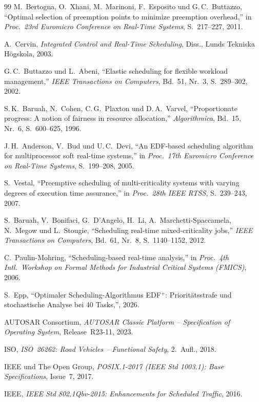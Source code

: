 ﻿\documentclass[a4paper,12pt]{report}
\theoremstyle{definition}
\begin{document}
\begin{thebibliography}{99}
M.\ Bertogna, O.\ Xhani, M.\ Marinoni, F.\ Esposito und G.\,C.\ Buttazzo,
``Optimal selection of preemption points to minimize preemption overhead,''
in \textit{Proc.\ 23rd Euromicro Conference on Real-Time Systems},
S.~217--227, 2011.


A.\ Cervin,
\textit{Integrated Control and Real-Time Scheduling},
Diss., Lunds Tekniska Högskola, 2003.

G.\,C.\ Buttazzo und L.\ Abeni,
``Elastic scheduling for flexible workload management,''
\textit{IEEE Transactions on Computers}, Bd.~51, Nr.~3, S.~289--302, 2002.


S.\,K.\ Baruah, N.\ Cohen, C.\,G.\ Plaxton und D.\,A.\ Varvel,
``Proportionate progress: A notion of fairness in resource allocation,''
\textit{Algorithmica}, Bd.~15, Nr.~6, S.~600--625, 1996.

J.\,H.\ Anderson, V.\ Bud und U.\,C.\ Devi,
``An EDF-based scheduling algorithm for multiprocessor soft real-time systems,''
in \textit{Proc.\ 17th Euromicro Conference on Real-Time Systems},
S.~199--208, 2005.


S.\ Vestal,
``Preemptive scheduling of multi-criticality systems with varying
degrees of execution time assurance,''
in \textit{Proc.\ 28th IEEE RTSS}, S.~239--243, 2007.

S.\ Baruah, V.\ Bonifaci, G.\ D'Angelo, H.\ Li, A.\ Marchetti-Spaccamela,
N.\ Megow und L.\ Stougie,
``Scheduling real-time mixed-criticality jobs,''
\textit{IEEE Transactions on Computers}, Bd.~61, Nr.~8, S.~1140--1152, 2012.


C.\ Paulin-Mohring,
``Scheduling-based real-time analysis,''
in \textit{Proc.\ 4th Intl.\ Workshop on Formal Methods for Industrial
Critical Systems (FMICS)}, 2006.


S.\ Epp,
``Optimaler Scheduling-Algorithmus EDF$^+$: Prioritätsstrafe und
stochastische Analyse bei 40 Tasks,'', 2026.


AUTOSAR Consortium,
\textit{AUTOSAR Classic Platform -- Specification of Operating System},
Release~R23-11, 2023.

ISO,
\textit{ISO~26262: Road Vehicles -- Functional Safety},
2.~Aufl., 2018.

IEEE und The Open Group,
\textit{POSIX.1-2017 (IEEE Std 1003.1): Base Specifications},
Issue~7, 2017.

IEEE,
\textit{IEEE Std 802.1Qbv-2015: Enhancements for Scheduled Traffic},
2016.

\end{thebibliography}
\end{document}
